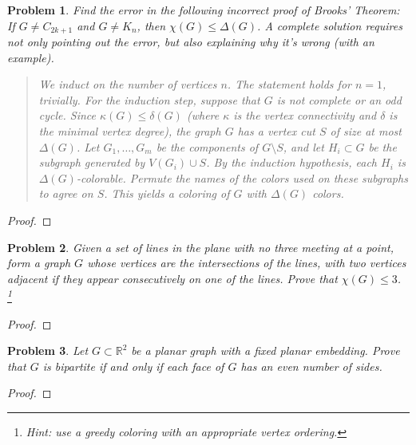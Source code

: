 \documentclass[11pt]{article}
\newtheorem{problem}{Problem}
\begin{document}
\begin{problem}
Find the error in the following incorrect proof of Brooks' Theorem: If $G\neq C_{2k+1}$ and $G\neq K_n$, then $\chi(G)\le\Delta(G)$. A complete solution requires not only pointing out the error, but also explaining why it's wrong (with an example). 

\begin{quotation}
We induct on the number of vertices $n$. The statement holds for $n=1$, trivially. For the induction step, suppose that $G$ is not complete or an odd cycle. Since $\kappa(G)\le\delta(G)$ (where $\kappa$ is the vertex connectivity and $\delta$ is the minimal vertex degree), the graph $G$ has a vertex cut $S$ of size at most $\Delta(G)$. Let $G_1,\ldots,G_m$ be the components of $G\setminus S$, and let $H_i\subset G$ be the subgraph generated by $V(G_i)\cup S$. By the induction hypothesis, each $H_i$ is $\Delta(G)$-colorable. Permute the names of the colors used on these subgraphs to agree on $S$. This yields a coloring of $G$ with $\Delta(G)$ colors. 
\end{quotation} 
\end{problem}

\begin{proof}

\end{proof}

\pagebreak 

\begin{problem}
Given a set of lines in the plane with no three meeting at a point, form a graph $G$ whose vertices are the intersections of the lines, with two vertices adjacent if they appear consecutively on one of the lines. Prove that $\chi(G)\le3$. 
\footnote{Hint: use a greedy coloring with an appropriate vertex ordering. } 
\end{problem}

\begin{proof}

\end{proof}

\pagebreak 

\begin{problem}
Let $G\subset\mathbb R^2$ be a planar graph with a fixed planar embedding. Prove that $G$ is bipartite if and only if each face of $G$ has an even number of sides. 
\end{problem}

\begin{proof}

\end{proof}
\end{document}
